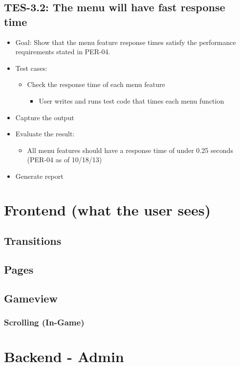 \subsection{TES-3.2: The menu will have fast response time }
\label{menu}
\begin{itemize}
\item Goal: Show that the menu feature response times satisfy the performance
requirements stated in PER-04. 
\item Test cases: 

\begin{itemize}
\item Check the response time of each menu feature 

\begin{itemize}
\item User writes and runs test code that times each menu function 
\end{itemize}
\end{itemize}
\item Capture the output 
\item Evaluate the result: 

\begin{itemize}
\item All menu features should have a response time of under 0.25 seconds
(PER-04 as of 10/18/13) 
\end{itemize}
\item Generate report \end{itemize}
\section{Frontend (what the user sees)}
\subsection{Transitions}
\subsection{Pages}
\subsection{Gameview}
\subsubsection{Scrolling (In-Game)}
\section{Backend - Admin}
